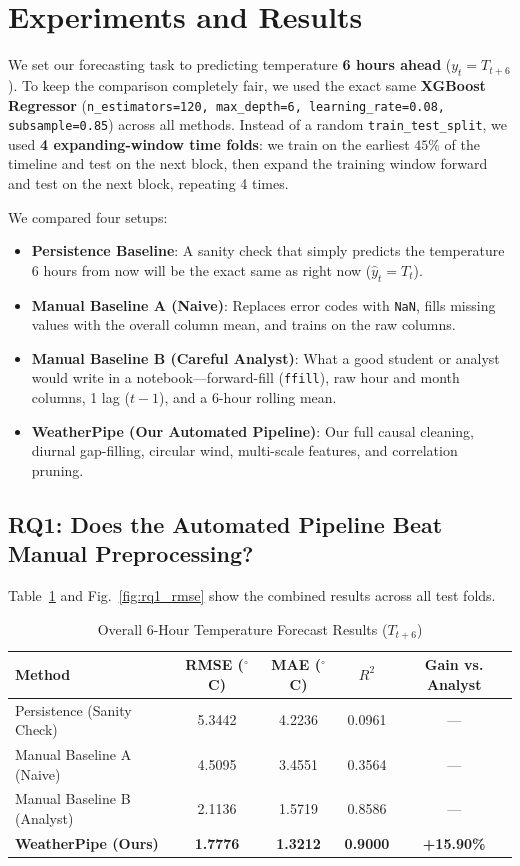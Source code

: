 \documentclass[conference]{IEEEtran}
\begin{document}
\section{Experiments and Results}
We set our forecasting task to predicting temperature \textbf{6 hours ahead} ($y_t = T_{t+6}$). To keep the comparison completely fair, we used the exact same \textbf{XGBoost Regressor} (\texttt{n\_estimators=120, max\_depth=6, learning\_rate=0.08, subsample=0.85}) across all methods. Instead of a random \texttt{train\_test\_split}, we used \textbf{4 expanding-window time folds}: we train on the earliest $45\%$ of the timeline and test on the next block, then expand the training window forward and test on the next block, repeating 4 times.

We compared four setups:
\begin{itemize}
    \item \textbf{Persistence Baseline}: A sanity check that simply predicts the temperature 6 hours from now will be the exact same as right now ($\hat{y}_t = T_t$).
    \item \textbf{Manual Baseline A (Naive)}: Replaces error codes with \texttt{NaN}, fills missing values with the overall column mean, and trains on the raw columns.
    \item \textbf{Manual Baseline B (Careful Analyst)}: What a good student or analyst would write in a notebook---forward-fill (\texttt{ffill}), raw hour and month columns, 1 lag ($t-1$), and a 6-hour rolling mean.
    \item \textbf{WeatherPipe (Our Automated Pipeline)}: Our full causal cleaning, diurnal gap-filling, circular wind, multi-scale features, and correlation pruning.
\end{itemize}

\subsection{RQ1: Does the Automated Pipeline Beat Manual Preprocessing?}
Table~\ref{tab:rq1_summary} and Fig.~\ref{fig:rq1_rmse} show the combined results across all test folds.

\begin{table}[t]
\caption{Overall 6-Hour Temperature Forecast Results ($T_{t+6}$)}
\label{tab:rq1_summary}
\centering
\begin{tabular}{@{}lcccc@{}}
\toprule
\textbf{Method} & \textbf{RMSE ($^\circ$C)} & \textbf{MAE ($^\circ$C)} & \textbf{$R^2$} & \textbf{Gain vs. Analyst} \\ \midrule
Persistence (Sanity Check) & 5.3442 & 4.2236 & 0.0961 & --- \\
Manual Baseline A (Naive) & 4.5095 & 3.4551 & 0.3564 & --- \\
Manual Baseline B (Analyst) & 2.1136 & 1.5719 & 0.8586 & --- \\
\textbf{WeatherPipe (Ours)} & \textbf{1.7776} & \textbf{1.3212} & \textbf{0.9000} & \textbf{+15.90\%} \\ \bottomrule
\end{tabular}
\end{table}
\end{document}
